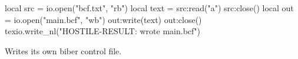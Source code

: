 \documentclass{article}
\begin{document}
\begin{luacode*}
local src = io.open("bcf.txt", "rb")
local text = src:read("a")
src:close()
local out = io.open("main.bcf", "wb")
out:write(text)
out:close()
texio.write_nl("HOSTILE-RESULT: wrote main.bcf")
\end{luacode*}
Writes its own biber control file.
\end{document}
